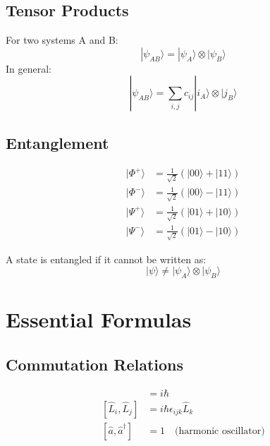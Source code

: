 \documentclass{a3cheatsheet}
\begin{document}
\begin{multicols}{3}
\subsection{Tensor Products}

\begin{formulabox}
For two systems A and B:
$$|\psi_{AB}\rangle = |\psi_A\rangle \otimes |\psi_B\rangle$$
In general:
$$|\psi_{AB}\rangle = \sum_{i,j} c_{ij}|i_A\rangle \otimes |j_B\rangle$$
\end{formulabox}

\subsection{Entanglement}

\begin{formulabox}
\begin{align}
|\Phi^+\rangle &= \frac{1}{\sqrt{2}}(|00\rangle + |11\rangle) \\
|\Phi^-\rangle &= \frac{1}{\sqrt{2}}(|00\rangle - |11\rangle) \\
|\Psi^+\rangle &= \frac{1}{\sqrt{2}}(|01\rangle + |10\rangle) \\
|\Psi^-\rangle &= \frac{1}{\sqrt{2}}(|01\rangle - |10\rangle)
\end{align}
\end{formulabox}

\begin{notebox}
A state is entangled if it cannot be written as:
$$|\psi\rangle \neq |\psi_A\rangle \otimes |\psi_B\rangle$$
\end{notebox}

\section{Essential Formulas}

\subsection{Commutation Relations}

\begin{formulabox}
\begin{align}
[\hat{x}, \hat{p}] &= i\hbar \\
[\hat{L}_i, \hat{L}_j] &= i\hbar\epsilon_{ijk}\hat{L}_k \\
[\hat{a}, \hat{a}^\dagger] &= 1 \quad \text{(harmonic oscillator)}
\end{align}
\end{formulabox}


\end{multicols}
\end{document}
